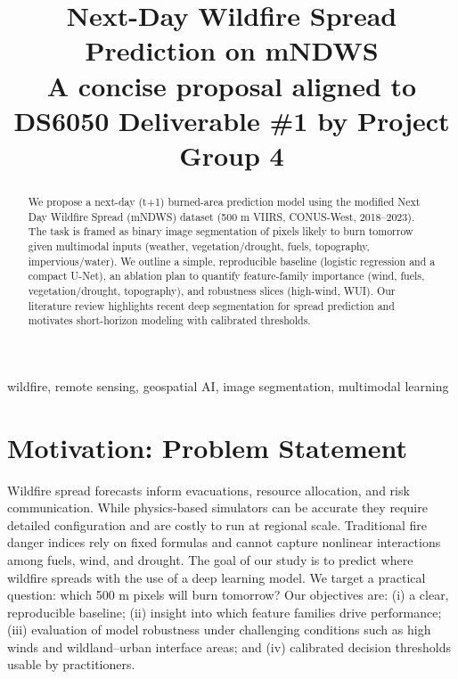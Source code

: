 \documentclass[conference]{IEEEtran}
\begin{document}
\title{Next-Day Wildfire Spread Prediction on mNDWS\\
{\footnotesize A concise proposal aligned to DS6050 Deliverable \#1 by Project Group 4}
}

\author{
}


\maketitle

\begin{abstract}
We propose a next-day (t+1) burned-area prediction model using the modified Next Day Wildfire Spread (mNDWS) dataset (500 m VIIRS, CONUS-West, 2018--2023). The task is framed as binary image segmentation of pixels likely to burn tomorrow given multimodal inputs (weather, vegetation/drought, fuels, topography, impervious/water). We outline a simple, reproducible baseline (logistic regression and a compact U-Net), an ablation plan to quantify feature-family importance (wind, fuels, vegetation/drought, topography), and robustness slices (high-wind, WUI). Our literature review highlights recent deep segmentation for spread prediction and motivates short-horizon modeling with calibrated thresholds.
\end{abstract}

\begin{IEEEkeywords}
wildfire, remote sensing, geospatial AI, image segmentation, multimodal learning
\end{IEEEkeywords}

\section{Motivation: Problem Statement}
Wildfire spread forecasts inform evacuations, resource allocation, and risk communication. While physics-based simulators can be accurate they require detailed configuration and are costly to run at regional scale. Traditional fire danger indices rely on fixed formulas and cannot capture nonlinear interactions among fuels, wind, and drought. The goal of our study is to predict where wildfire spreads with the use of a deep learning model. We target a practical question: which 500 m pixels will burn tomorrow? Our objectives are: (i) a clear, reproducible baseline; (ii) insight into which feature families drive performance; (iii) evaluation of model robustness under challenging conditions such as high winds and wildland–urban interface areas; and (iv) calibrated decision thresholds usable by practitioners.
\end{document}
